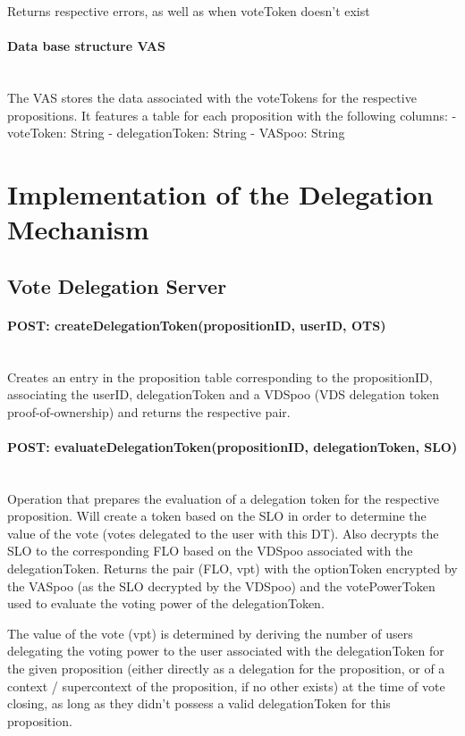 Returns respective errors, as well as when voteToken doesn't exist

\paragraph*{Data base structure VAS} \mbox{} \\
The VAS stores the data associated with the voteTokens for the respective propositions. It features a table for each proposition with the following columns:
 - voteToken: String
 - delegationToken: String
 - VASpoo: String

\section{Implementation of the Delegation Mechanism}

\subsection{Vote Delegation Server}

\paragraph*{POST: createDelegationToken(propositionID, userID, OTS)} \mbox{} \\

Creates an entry in the proposition table corresponding to the propositionID, associating the userID, delegationToken and a VDSpoo (VDS delegation token proof-of-ownership) and returns the respective pair.

\paragraph*{POST: evaluateDelegationToken(propositionID, delegationToken, SLO)} \mbox{} \\

Operation that prepares the evaluation of a delegation token for the respective proposition. Will create a token based on the SLO in order to determine the value of the vote (votes delegated to the user with this DT). Also decrypts the SLO to the corresponding FLO based on the VDSpoo associated with the delegationToken.
Returns the pair (FLO, vpt) with the optionToken encrypted by the VASpoo (as the SLO decrypted by the VDSpoo) and the votePowerToken used to evaluate the voting power of the delegationToken.

The value of the vote (vpt) is determined by deriving the number of users delegating the voting power to the user associated with the delegationToken for the given proposition (either directly as a delegation for the proposition, or of a context / supercontext of the proposition, if no other exists) at the time of vote closing, as long as they didn't possess a valid delegationToken for this proposition. 

